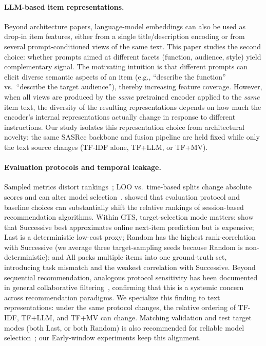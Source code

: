 \documentclass[sigconf,natbib=true,anonymous]{acmart}
\newcommand{\tfidf}{\textsc{TF-IDF}\xspace}
\newcommand{\tfllm}{\textsc{TF+LLM}\xspace}
\newcommand{\tfmv}{\textsc{TF+MV}\xspace}
\begin{document}
\paragraph{LLM-based item representations.}
Beyond architecture papers, language-model embeddings can also be used as drop-in item features, either from a single title/description encoding or from several prompt-conditioned views of the same text.
This paper studies the second choice: whether prompts aimed at different facets (function, audience, style) yield complementary signal.
The motivating intuition is that different prompts can elicit diverse semantic aspects of an item (e.g., ``describe the function'' vs.\ ``describe the target au\-dience''), thereby increasing feature coverage.
However, when all views are produced by the \emph{same} pretrained encoder applied to the \emph{same} item text, the diversity of the resulting representations depends on how much the encoder's internal representations actually change in response to different instructions.
Our study isolates this representation choice from architectural novelty: the same SASRec backbone and fusion pipeline are held fixed while only the text source changes (\tfidf alone, \tfllm, or \tfmv).

\paragraph{Evaluation protocols and temporal leakage.}
Sampled metrics distort rankings~\cite{krichene2020sampledmetrics}; LOO vs.\ time-based splits change absolute scores and can alter model selection~\cite{ji2023evaluation,sun2023reevaluation,meng2020temporal}.
\citet{ludewig2018evaluation} showed that evaluation protocol and baseline choices can substantially shift the relative rankings of session-based recommendation algorithms.
Within GTS, target-selection mode matters: \citet{gusak2025time} show that Successive best approximates online next-item prediction but is expensive; Last is a deterministic low-cost proxy; Random has the highest rank-correlation with Successive (we average three target-sampling seeds because Random is non-deterministic); and All packs multiple items into one ground-truth set, introducing task mismatch and the weakest correlation with Successive.
Beyond sequential recommendation, analogous protocol sensitivity has been documented in general collaborative filtering~\cite{meng2020temporal}, confirming that this is a systemic concern across recommendation paradigms.
We specialize this finding to text representations: under the same protocol changes, the relative ordering of \tfidf, \tfllm, and \tfmv can change.
Matching validation and test target modes (both Last, or both Random) is also recommended for reliable model selection~\cite{gusak2025time}; our Early-window experiments keep this alignment.
\end{document}
